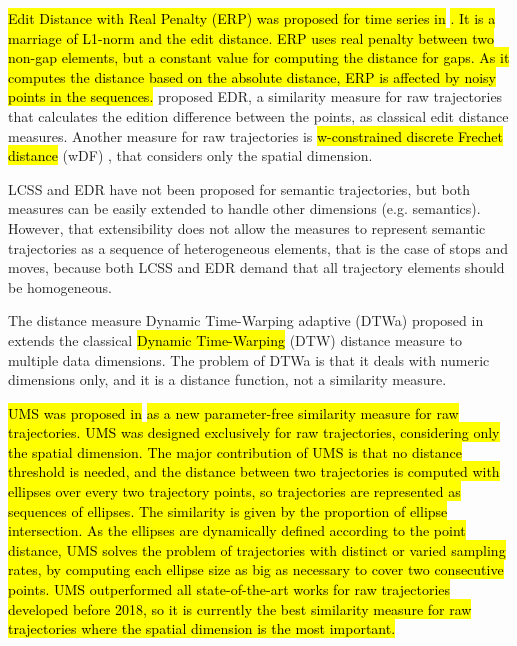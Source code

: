 \documentclass[12pt]{article}
\begin{document}
\hl{Edit Distance with Real Penalty (ERP) was proposed for time series in }\cite{Chen:2004:MLE:1316689.1316758}\hl{.  It is a marriage of L1-norm and the edit distance. ERP uses real penalty between two non-gap elements, but a constant value for computing the distance for gaps. 
As it computes the distance based on the absolute distance, ERP is affected by noisy points in the sequences.} \cite{Chen:2005:RFS:1066157.1066213} proposed EDR, a similarity measure for raw trajectories that calculates the edition difference between the points, as classical edit distance measures. Another measure for raw trajectories is \hl{w-constrained discrete Frechet distance} (wDF) \citep{Ding:2008:ESJ:1440463.1440989}, that considers only the spatial dimension. 

LCSS and EDR have not been proposed for semantic trajectories, but both measures can be easily extended to handle other dimensions (e.g. semantics). However, that extensibility does not allow the measures to represent semantic trajectories as a sequence of heterogeneous elements, that is the case of stops and moves, because both LCSS and EDR demand that all trajectory elements should be homogeneous.

The distance measure Dynamic Time-Warping adaptive (DTWa) proposed in \cite{Shokoohi-Yekta2017} extends the classical \hl{Dynamic Time-Warping} (DTW) \citep{berndt1994using} distance measure to multiple data dimensions. The problem of DTWa is that it deals with numeric dimensions only, and it is a distance function, not a similarity measure.

\hl{UMS was proposed in }\cite{Furtado-UMS-2018}\hl{ as a new parameter-free similarity measure for raw trajectories. UMS was designed exclusively for raw trajectories, considering only the spatial dimension. The major contribution of UMS is that no distance threshold is needed, and the distance between two trajectories is computed with ellipses over every two trajectory points, so trajectories are represented as sequences of ellipses. The similarity is given by the proportion of ellipse intersection. As the ellipses are dynamically defined according to the point distance, UMS solves the problem of trajectories with distinct or varied sampling rates, by computing each ellipse size as big as necessary to cover two consecutive points. UMS outperformed all state-of-the-art works for raw trajectories developed before 2018, so it is currently the best similarity measure for raw trajectories where the spatial dimension is the most important.}
\end{document}
